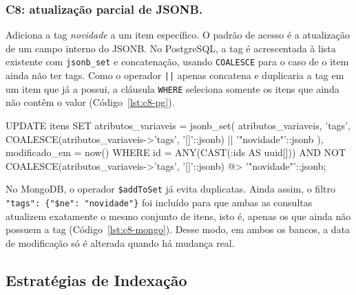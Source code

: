 
\subsubsection{C8: atualização parcial de JSONB.} Adiciona a tag \textit{novidade} a um item específico. O padrão de acesso é a atualização de um campo interno do JSONB. No PostgreSQL, a tag é acrescentada à lista existente com \texttt{jsonb\_set} e concatenação, usando \texttt{COALESCE} para o caso de o item ainda não ter tags. Como o operador \texttt{||} apenas concatena e duplicaria a tag em um item que já a possui, a cláusula \texttt{WHERE} seleciona somente os itens que ainda não contêm o valor (Código~\ref{lst:c8-pg}).

\begin{codigo}[language=SQL, breaklines=true, caption={C8 no PostgreSQL.}, label={lst:c8-pg}]
UPDATE itens
SET atributos_variaveis = jsonb_set(
      atributos_variaveis, '{tags}',
      COALESCE(atributos_variaveis->'tags', '[]'::jsonb) || '"novidade"'::jsonb
    ),
    modificado_em = now()
WHERE id = ANY(CAST(:ids AS uuid[]))
  AND NOT COALESCE(atributos_variaveis->'tags', '[]'::jsonb) @> '"novidade"'::jsonb;
\end{codigo}

No MongoDB, o operador \texttt{\$addToSet} já evita duplicatas. Ainda assim, o filtro \texttt{"tags": \{"\$ne": "novidade"\}} foi incluído para que ambas as consultas atualizem exatamente o mesmo conjunto de itens, isto é, apenas os que ainda não possuem a tag (Código~\ref{lst:c8-mongo}). Desse modo, em ambos os bancos, a data de modificação só é alterada quando há mudança real.


\subsection{Estratégias de Indexação}
\label{sec:indexacao}

